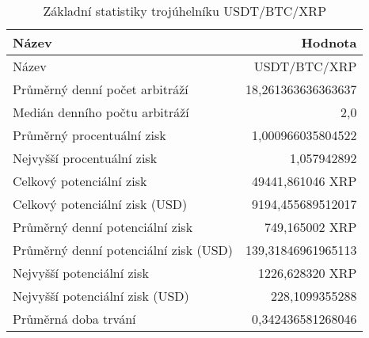 \begin{table}\centering
\caption{Základní statistiky trojúhelníku USDT/BTC/XRP}
\label{USDTBTCXRP_stats}
\begin{tabular}{|| l | r ||}
\hline Název & Hodnota \\ 
\hline\hline Název & USDT/BTC/XRP \\ 
\hline Průměrný denní počet arbitráží & 18,261363636363637 \\ 
\hline Medián denního počtu arbitráží & 2,0 \\ 
\hline Průměrný procentuální zisk & 1,000966035804522 \\ 
\hline Nejvyšší procentuální zisk & 1,057942892 \\ 
\hline Celkový potenciální zisk & 49441,861046 XRP \\ 
\hline Celkový potenciální zisk (USD) & 9194,455689512017 \\ 
\hline Průměrný denní potenciální zisk & 749,165002 XRP \\ 
\hline Průměrný denní potenciální zisk (USD) & 139,31846961965113 \\ 
\hline Nejvyšší potenciální zisk & 1226,628320 XRP \\ 
\hline Nejvyšší potenciální zisk (USD) & 228,1099355288 \\ 
\hline Průměrná doba trvání & 0,342436581268046 \\ 
\hline
\end{tabular}
\end{table}